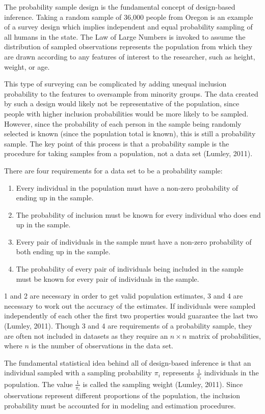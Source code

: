 \documentclass[12pt,twoside]{reedthesis}
\begin{document}
The probability sample design is the fundamental concept of design-based
inference. Taking a random sample of 36,000 people from Oregon is an
example of a survey design which implies independent and equal
probability sampling of all humans in the state. The Law of Large
Numbers is invoked to assume the distribution of sampled observations
represents the population from which they are drawn according to any
features of interest to the researcher, such as height, weight, or age.

This type of surveying can be complicated by adding unequal inclusion
probability to the features to oversample from minority groups. The data
created by such a design would likely not be representative of the
population, since people with higher inclusion probabilities would be
more likely to be sampled. However, since the probability of each person
in the sample being randomly selected is known (since the population
total is known), this is still a probability sample. The key point of
this process is that a probability sample is the procedure for taking
samples from a population, not a data set (Lumley, 2011).

There are four requirements for a data set to be a probability sample:
\begin{enumerate}
\def\labelenumi{\arabic{enumi}.}
\item
  Every individual in the population must have a non-zero probability of
  ending up in the sample.
\item
  The probability of inclusion must be known for every individual who
  does end up in the sample.
\item
  Every pair of individuals in the sample must have a non-zero
  probability of both ending up in the sample.
\item
  The probability of every pair of individuals being included in the
  sample must be known for every pair of individuals in the sample.
\end{enumerate}
1 and 2 are necessary in order to get valid population estimates, 3 and
4 are necessary to work out the accuracy of the estimates. If
individuals were sampled independently of each other the first two
properties would guarantee the last two (Lumley, 2011). Though 3 and 4
are requirements of a probability sample, they are often not included in
datasets as they require an \(n \times n\) matrix of probabilities,
where \(n\) is the number of observations in the data set.

The fundamental statistical idea behind all of design-based inference is
that an individual sampled with a sampling probability \(\pi_i\)
represents \(\frac{1}{\pi_i}\) individuals in the population. The value
\(\frac{1}{\pi_i}\) is called the sampling weight (Lumley, 2011). Since
observations represent different proportions of the population, the
inclusion probability must be accounted for in modeling and estimation
procedures.
\end{document}
